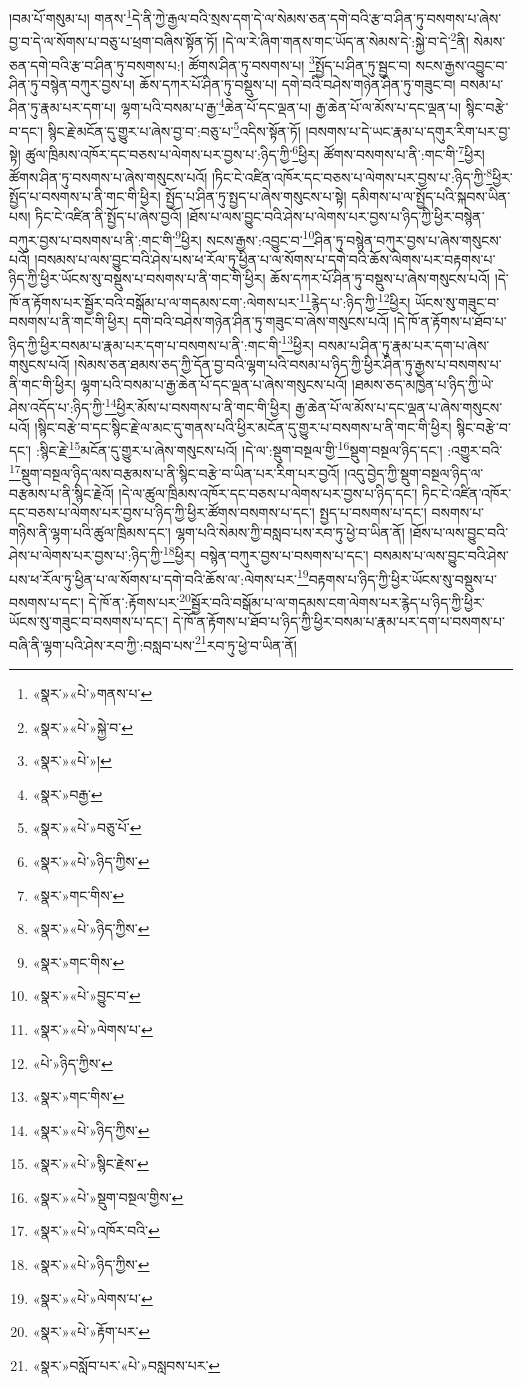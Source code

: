 །བམ་པོ་གསུམ་པ། གནས་\footnote{«སྣར་»«པེ་»གནས་པ་}དེ་ནི་ཀྱེ་རྒྱལ་བའི་སྲས་དག་དེ་ལ་སེམས་ཅན་དགེ་བའི་རྩ་བ་ཤིན་ཏུ་བསགས་པ་ཞེས་བྱ་བ་དེ་ལ་སོགས་པ་བཅུ་པ་ཕྲག་བཞིས་སྟོན་ཏོ། །དེ་ལ་རེ་ཞིག་གནས་གང་ཡོད་ན་སེམས་དེ་:སྐྱེ་བ་དེ་\footnote{«སྣར་»«པེ་»སྐྱེ་བ་}ནི། སེམས་ཅན་དགེ་བའི་རྩ་བ་ཤིན་ཏུ་བསགས་པ:། ཚོགས་ཤིན་ཏུ་བསགས་པ། \footnote{«སྣར་»«པེ་»།  }སྤྱོད་པ་ཤིན་ཏུ་སྦྱང་བ། སངས་རྒྱས་འབྱུང་བ་ཤིན་ཏུ་བསྙེན་བཀུར་བྱས་པ། ཆོས་དཀར་པོ་ཤིན་ཏུ་བསྡུས་པ། དགེ་བའི་བཤེས་གཉེན་ཤིན་ཏུ་གཟུང་བ། བསམ་པ་ཤིན་ཏུ་རྣམ་པར་དག་པ། ལྷག་པའི་བསམ་པ་རྒྱ་\footnote{«སྣར་»བརྒྱ་}ཆེན་པོ་དང་ལྡན་པ། རྒྱ་ཆེན་པོ་ལ་མོས་པ་དང་ལྡན་པ། སྙིང་བརྩེ་བ་དང་། སྙིང་རྗེ་མངོན་དུ་གྱུར་པ་ཞེས་བྱ་བ་:བཅུ་པ་\footnote{«སྣར་»«པེ་»བཅུ་པོ་}འདིས་སྟོན་ཏོ། །བསགས་པ་དེ་ཡང་རྣམ་པ་དགུར་རིག་པར་བྱ་སྟེ། ཚུལ་ཁྲིམས་འཁོར་དང་བཅས་པ་ལེགས་པར་བྱས་པ་:ཉིད་ཀྱི་\footnote{«སྣར་»«པེ་»ཉིད་ཀྱིས་}ཕྱིར། ཚོགས་བསགས་པ་ནི་:གང་གི་\footnote{«སྣར་»གང་གིས་}ཕྱིར། ཚོགས་ཤིན་ཏུ་བསགས་པ་ཞེས་གསུངས་པའོ། །ཏིང་ངེ་འཛིན་འཁོར་དང་བཅས་པ་ལེགས་པར་བྱས་པ་:ཉིད་ཀྱི་\footnote{«སྣར་»«པེ་»ཉིད་ཀྱིས་}ཕྱིར་སྤྱོད་པ་བསགས་པ་ནི་གང་གི་ཕྱིར། སྤྱོད་པ་ཤིན་ཏུ་སྤྱད་པ་ཞེས་གསུངས་པ་སྟེ། དམིགས་པ་ལ་སྤྱོད་པའི་སྐབས་ཡིན་པས། ཏིང་ངེ་འཛིན་ནི་སྤྱོད་པ་ཞེས་བྱའོ། །ཐོས་པ་ལས་བྱུང་བའི་ཤེས་པ་ལེགས་པར་བྱས་པ་ཉིད་ཀྱི་ཕྱིར་བསྙེན་བཀུར་བྱས་པ་བསགས་པ་ནི་:གང་གི་\footnote{«སྣར་»གང་གིས་}ཕྱིར། སངས་རྒྱས་:འབྱུང་བ་\footnote{«སྣར་»«པེ་»བྱུང་བ་}ཤིན་ཏུ་བསྙེན་བཀུར་བྱས་པ་ཞེས་གསུངས་པའོ། །བསམས་པ་ལས་བྱུང་བའི་ཤེས་པས་ཕ་རོལ་ཏུ་ཕྱིན་པ་ལ་སོགས་པ་དགེ་བའི་ཆོས་ལེགས་པར་བརྟགས་པ་ཉིད་ཀྱི་ཕྱིར་ཡོངས་སུ་བསྡུས་པ་བསགས་པ་ནི་གང་གི་ཕྱིར། ཆོས་དཀར་པོ་ཤིན་ཏུ་བསྡུས་པ་ཞེས་གསུངས་པའོ། །དེ་ཁོ་ན་རྟོགས་པར་སྦྱོར་བའི་བསྒོམ་པ་ལ་གདམས་ངག་:ལེགས་པར་\footnote{«སྣར་»«པེ་»ལེགས་པ་}རྙེད་པ་:ཉིད་ཀྱི་\footnote{«པེ་»ཉིད་ཀྱིས་}ཕྱིར། ཡོངས་སུ་གཟུང་བ་བསགས་པ་ནི་གང་གི་ཕྱིར། དགེ་བའི་བཤེས་གཉེན་ཤིན་ཏུ་གཟུང་བ་ཞེས་གསུངས་པའོ། །དེ་ཁོ་ན་རྟོགས་པ་ཐོབ་པ་ཉིད་ཀྱི་ཕྱིར་བསམ་པ་རྣམ་པར་དག་པ་བསགས་པ་ནི་:གང་གི་\footnote{«སྣར་»གང་གིས་}ཕྱིར། བསམ་པ་ཤིན་ཏུ་རྣམ་པར་དག་པ་ཞེས་གསུངས་པའོ། །སེམས་ཅན་ཐམས་ཅད་ཀྱི་དོན་བྱ་བའི་ལྷག་པའི་བསམ་པ་ཉིད་ཀྱི་ཕྱིར་ཤིན་ཏུ་རྒྱས་པ་བསགས་པ་ནི་གང་གི་ཕྱིར། ལྷག་པའི་བསམ་པ་རྒྱ་ཆེན་པོ་དང་ལྡན་པ་ཞེས་གསུངས་པའོ། །ཐམས་ཅད་མཁྱེན་པ་ཉིད་ཀྱི་ཡེ་ཤེས་འདོད་པ་:ཉིད་ཀྱི་\footnote{«སྣར་»«པེ་»ཉིད་ཀྱིས་}ཕྱིར་མོས་པ་བསགས་པ་ནི་གང་གི་ཕྱིར། རྒྱ་ཆེན་པོ་ལ་མོས་པ་དང་ལྡན་པ་ཞེས་གསུངས་པའོ། །སྙིང་བརྩེ་བ་དང་སྙིང་རྗེ་ལ་མང་དུ་གནས་པའི་ཕྱིར་མངོན་དུ་གྱུར་པ་བསགས་པ་ནི་གང་གི་ཕྱིར། སྙིང་བརྩེ་བ་དང་། :སྙིང་རྗེ་\footnote{«སྣར་»«པེ་»སྙིང་རྗེས་}མངོན་དུ་གྱུར་པ་ཞེས་གསུངས་པའོ། །དེ་ལ་:སྡུག་བསྔལ་གྱི་\footnote{«སྣར་»«པེ་»སྡུག་བསྔལ་གྱིས་}སྡུག་བསྔལ་ཉིད་དང་། :འགྱུར་བའི་\footnote{«སྣར་»«པེ་»འཁོར་བའི་}སྡུག་བསྔལ་ཉིད་ལས་བརྩམས་པ་ནི་སྙིང་བརྩེ་བ་ཡིན་པར་རིག་པར་བྱའོ། །འདུ་བྱེད་ཀྱི་སྡུག་བསྔལ་ཉིད་ལ་བརྩམས་པ་ནི་སྙིང་རྗེའོ། །དེ་ལ་ཚུལ་ཁྲིམས་འཁོར་དང་བཅས་པ་ལེགས་པར་བྱས་པ་ཉིད་དང་། ཏིང་ངེ་འཛིན་འཁོར་དང་བཅས་པ་ལེགས་པར་བྱས་པ་ཉིད་ཀྱི་ཕྱིར་ཚོགས་བསགས་པ་དང་། སྤྱད་པ་བསགས་པ་དང་། བསགས་པ་གཉིས་ནི་ལྷག་པའི་ཚུལ་ཁྲིམས་དང་། ལྷག་པའི་སེམས་ཀྱི་བསླབ་པས་རབ་ཏུ་ཕྱེ་བ་ཡིན་ནོ། །ཐོས་པ་ལས་བྱུང་བའི་ཤེས་པ་ལེགས་པར་བྱས་པ་:ཉིད་ཀྱི་\footnote{«སྣར་»«པེ་»ཉིད་ཀྱིས་}ཕྱིར། བསྙེན་བཀུར་བྱས་པ་བསགས་པ་དང་། བསམས་པ་ལས་བྱུང་བའི་ཤེས་པས་ཕ་རོལ་ཏུ་ཕྱིན་པ་ལ་སོགས་པ་དགེ་བའི་ཆོས་ལ་:ལེགས་པར་\footnote{«སྣར་»«པེ་»ལེགས་པ་}བརྟགས་པ་ཉིད་ཀྱི་ཕྱིར་ཡོངས་སུ་བསྡུས་པ་བསགས་པ་དང་། དེ་ཁོ་ན་:རྟོགས་པར་\footnote{«སྣར་»«པེ་»རྟོག་པར་}སྦྱོར་བའི་བསྒོམ་པ་ལ་གདམས་ངག་ལེགས་པར་རྙེད་པ་ཉིད་ཀྱི་ཕྱིར་ཡོངས་སུ་གཟུང་བ་བསགས་པ་དང་། དེ་ཁོ་ན་རྟོགས་པ་ཐོབ་པ་ཉིད་ཀྱི་ཕྱིར་བསམ་པ་རྣམ་པར་དག་པ་བསགས་པ་བཞི་ནི་ལྷག་པའི་ཤེས་རབ་ཀྱི་:བསླབ་པས་\footnote{«སྣར་»བསློབ་པར་«པེ་»བསླབས་པར་}རབ་ཏུ་ཕྱེ་བ་ཡིན་ནོ། 
